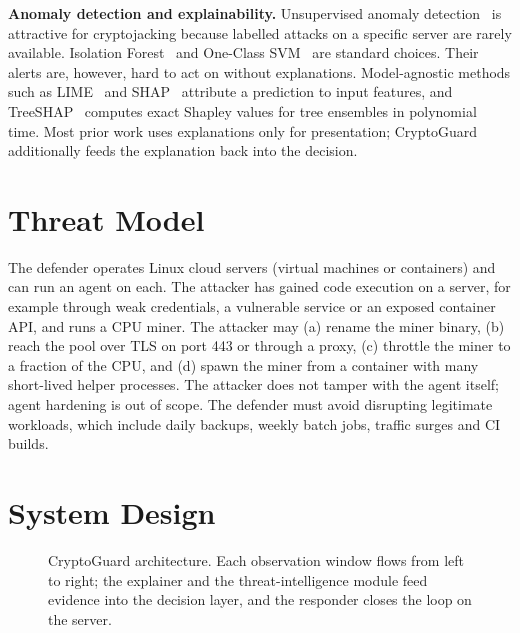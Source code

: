 \documentclass[conference]{IEEEtran}
\begin{document}
\textbf{Anomaly detection and explainability.} Unsupervised anomaly detection~\cite{chandola2009} is attractive for cryptojacking because labelled attacks on a specific server are rarely available. Isolation Forest~\cite{liu2008iforest} and One-Class SVM~\cite{scholkopf2001} are standard choices. Their alerts are, however, hard to act on without explanations. Model-agnostic methods such as LIME~\cite{ribeiro2016} and SHAP~\cite{lundberg2017} attribute a prediction to input features, and TreeSHAP~\cite{lundberg2020trees} computes exact Shapley values for tree ensembles in polynomial time. Most prior work uses explanations only for presentation; CryptoGuard additionally feeds the explanation back into the decision.

\section{Threat Model}
The defender operates Linux cloud servers (virtual machines or containers) and can run an agent on each. The attacker has gained code execution on a server, for example through weak credentials, a vulnerable service or an exposed container API, and runs a CPU miner. The attacker may (a) rename the miner binary, (b) reach the pool over TLS on port 443 or through a proxy, (c) throttle the miner to a fraction of the CPU, and (d) spawn the miner from a container with many short-lived helper processes. The attacker does not tamper with the agent itself; agent hardening is out of scope. The defender must avoid disrupting legitimate workloads, which include daily backups, weekly batch jobs, traffic surges and CI builds.

\section{System Design}
\begin{figure}[t]
  \centering
  \resizebox{\textwidth}{!}{}
  \caption{CryptoGuard architecture. Each observation window flows from left to right; the explainer and the threat-intelligence module feed evidence into the decision layer, and the responder closes the loop on the server.}
  \label{fig:arch}
\end{figure}
\end{document}
